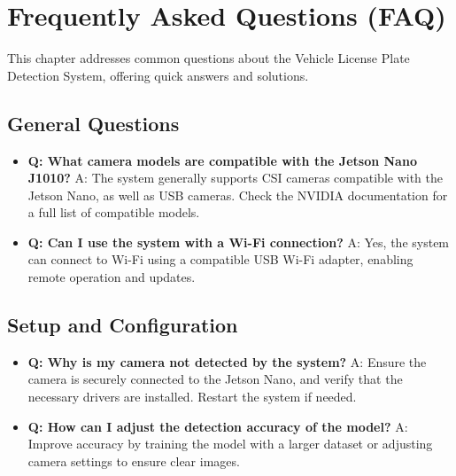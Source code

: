 %
%

\chapter{Frequently Asked Questions (FAQ)}

This chapter addresses common questions about the Vehicle License Plate Detection System, offering quick answers and solutions.

\section{General Questions}
\begin{itemize}[label=--, left=1.5em]
	\item \textbf{Q: What camera models are compatible with the Jetson Nano J1010?}  
	A: The system generally supports CSI cameras compatible with the Jetson Nano, as well as USB cameras. Check the NVIDIA documentation for a full list of compatible models.
	
	\item \textbf{Q: Can I use the system with a Wi-Fi connection?}  
	A: Yes, the system can connect to Wi-Fi using a compatible USB Wi-Fi adapter, enabling remote operation and updates.
\end{itemize}

\section{Setup and Configuration}
\begin{itemize}[label=--, left=1.5em]
	\item \textbf{Q: Why is my camera not detected by the system?}  
	A: Ensure the camera is securely connected to the Jetson Nano, and verify that the necessary drivers are installed. Restart the system if needed.
	
	\item \textbf{Q: How can I adjust the detection accuracy of the model?}  
	A: Improve accuracy by training the model with a larger dataset or adjusting camera settings to ensure clear images.
\end{itemize}

